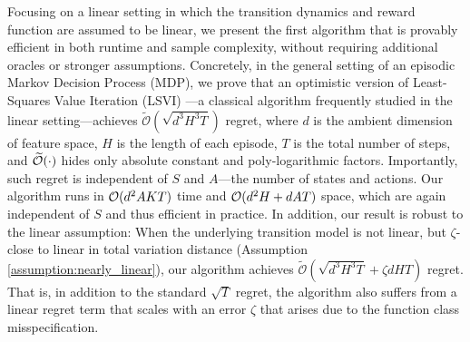Focusing on a linear setting in which the transition dynamics and reward function are assumed to be linear, we present the first algorithm that is provably efficient in both runtime and sample complexity, without requiring additional oracles or stronger assumptions. Concretely, in the general setting of an episodic Markov Decision Process (MDP), we prove that an optimistic version of Least-Squares Value Iteration (LSVI) \cite{bradtke1996linear,osband2014generalization}---a classical algorithm frequently studied in the linear setting---achieves $\tilde{\mathcal{O}}(\sqrt{d^3H^3T})$ regret, where $d$ is the ambient dimension of feature space, $H$ is the length of each episode, $T$ is the total number of steps, and $\widetilde{\mathcal{O}}(\cdot)$ hides only absolute constant and poly-logarithmic factors. Importantly, such regret is independent of $S$ and $A$---the number of states and actions. Our algorithm runs in $\mathcal{O}(d^2 AKT)$ time and $\mathcal{O}(d^2H + dAT)$ space, which are again independent of $S$ and thus efficient in practice. In addition, our result is robust to the linear assumption: When the underlying transition model is not linear, but $\zeta$-close to linear in total variation distance (Assumption \ref{assumption:nearly_linear}), our algorithm achieves $\tilde{\mathcal{O}}(\sqrt{d^3 H^3 T} + \zeta dHT)$ regret. That is, in addition to the standard $\sqrt{T}$ regret, the algorithm also suffers from a linear regret term that scales with an error $\zeta$ that arises due to the function class misspecification. 












